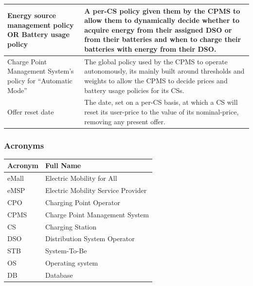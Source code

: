 \documentclass[11pt]{article}
\begin{document}
\begin{table}[H]
\begin{tabularx}{\textwidth}{|>{\centering\hsize=0.4\hsize}X|>{\hsize=1.6\hsize}X|}
        \hline
        Energy source management policy OR Battery usage policy & A per-CS policy given them by the CPMS to allow them to dynamically decide whether to acquire energy from their assigned DSO or from their batteries and when to charge their batteries with energy from their DSO. \\
        \hline
        Charge Point Management System's policy for “Automatic Mode” & The global policy used by the CPMS to operate autonomously, its mainly built around thresholds and weights to allow the CPMS to decide prices and battery usage policies for its CSs. \\
        \hline
        Offer reset date & The date, set on a per-CS basis, at which a CS will reset its user-price to the value of its nominal-price, removing any present offer. \\
        \hline
    \end{tabularx}
    \label{tab:definitions}
\end{table}

\subsubsection{Acronyms}

\begin{table}[H]
    \centering
    \setlength{\tabcolsep}{18pt}
    \renewcommand{\arraystretch}{1.2}
    \begin{tabularx}{\textwidth}{|>{\centering\hsize=0.3\hsize}X|>{\hsize=1.7\hsize}X|}
        \hline
        \textbf{Acronym} & \textbf{Full Name} \\
        \hline
        eMall & Electric Mobility for All \\
        \hline
        eMSP & Electric Mobility Service Provider \\
        \hline
        CPO & Charging Point Operator \\
        \hline
        CPMS & Charge Point Management System \\
        \hline
        CS & Charging Station \\
        \hline
        DSO & Distribution System Operator \\
        \hline
        STB & System-To-Be \\
        \hline
        OS & Operating system \\
        \hline
        DB & Database \\
        \hline
    \end{tabularx}
    \label{tab:acronyms}
\end{table}
\end{document}
